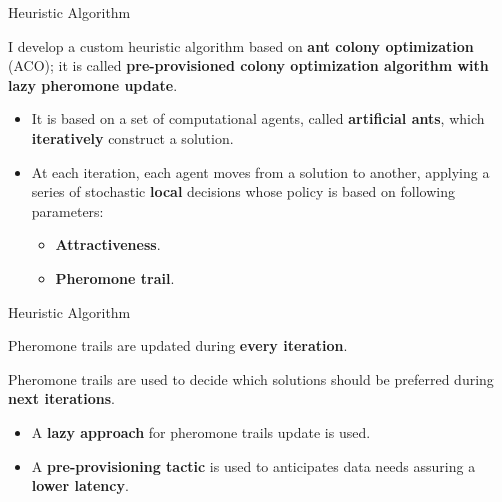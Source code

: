 \documentclass[13.5pt]{beamer}
\newcommand{\B}[1]{\textcolor{TorVergataColor}{\textbf{#1}}}
\begin{document}
\begin{frame}{Heuristic Algorithm}
	
	\begin{block}{}
		\centering
		I develop a custom heuristic algorithm based on \B{ant colony optimization} (ACO); it is called \B{pre-provisioned colony optimization algorithm with lazy pheromone update}.
	\end{block}
	\vspace{\baselineskip}
	\begin{itemize}
		\item It is based on a set of computational agents, called \B{artificial ants}, which \B{iteratively} construct a solution.
		
		\vspace{\baselineskip}
		
		\item At each iteration, each agent moves from a solution to another, applying a series of stochastic \B{local} decisions whose policy is based on following parameters:
		
		\begin{itemize}
			\item \B{Attractiveness}.
			\item \B{Pheromone trail}.
		\end{itemize}
		
	\end{itemize}
	
	
	
	
\end{frame}
\begin{frame}{Heuristic Algorithm}
	
	\begin{block}{}
		\centering
		Pheromone trails are updated during \B{every iteration}.
	\end{block}

	\begin{block}{}
		\centering
		Pheromone trails are used to decide which solutions should be preferred during \B{next iterations}.
	\end{block}

	\vspace{\baselineskip}

	\begin{itemize}
		\item A \B{lazy approach} for pheromone trails update is used.
		
		\vspace{\baselineskip}
		
		\item A \B{pre-provisioning tactic} is used to anticipates data needs assuring a \B{lower latency}.
	\end{itemize}



\end{frame}
\end{document}
